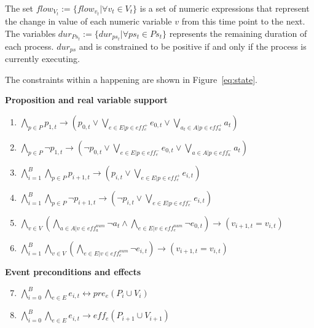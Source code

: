 The set $flow_{V_{t}}:=\{flow_{{v_t}} | \forall v_t\in V_t\}$ is a set of numeric expressions that represent the change in value of each numeric variable $v$ from this time point to the next. The variables $dur_{{Ps_t}}:=\{dur_{ps_t} | \forall ps_t\in Ps_t\}$ represents the remaining duration of each process. $dur_{ps}$ and is constrained to be positive if and only if the process is currently executing.

The constraints within a happening are shown in Figure~\ref{eq:state}. 

\begin{figure*}[thb!]
\textbf{Proposition and real variable support}
\begin{enumerate}[label=H\arabic*.]
  \item $\bigwedge_{p \in P} p_{1,t} \rightarrow (p_{0,t} \vee \bigvee_{e \in E | p \in eff^{+}_{e}} e_{0,t} \vee \bigvee_{a_t \in A | p \in eff^{+}_{a}} a_t)$
  \item $\bigwedge_{p \in P} \neg p_{1,t} \rightarrow (\neg p_{0,t} \vee \bigvee_{e \in E | p \in eff^{-}_{e}} e_{0,t} \vee \bigvee_{a \in A | p \in eff^{-}_{a}} a_t)$
  \item $\bigwedge_{i=1}^{B} \bigwedge_{p \in P} p_{i+1,t}      \rightarrow (     p_{i,t} \vee \bigvee_{e \in E | p \in eff^{+}_{e}} e_{i,t})$
  \item $\bigwedge_{i=1}^{B} \bigwedge_{p \in P} \neg p_{i+1,t} \rightarrow (\neg p_{i,t} \vee \bigvee_{e \in E | p \in eff^{-}_{e}} e_{i,t})$
  \item $\bigwedge_{v \in V} (\bigwedge_{a \in A | v \in eff^{num}_{a}} \neg a_{t} \wedge \bigwedge_{e \in E | v \in eff^{num}_{e}} \neg e_{0,t}) \rightarrow (v_{i+1,t} = v_{i,t})$
  \item $\bigwedge_{i=1}^{B} \bigwedge_{v \in V} (\bigwedge_{e \in E | v \in eff^{num}_{e}} \neg e_{i,t}) \rightarrow (v_{i+1,t} = v_{i,t})$
\end{enumerate}
\textbf{Event preconditions and effects}
\begin{enumerate}[label=H\arabic*.]\setcounter{enumi}{6}
 \item $\bigwedge_{i=0}^{B} \bigwedge_{e \in E} e_{i,t} \leftrightarrow pre_{e} (P_{i} \cup V_{i})$
 \item $\bigwedge_{i=0}^{B} \bigwedge_{e \in E} e_{i,t} \rightarrow eff_{e} (P_{i+1} \cup V_{i+1})$
\end{enumerate}

\end{figure*}
